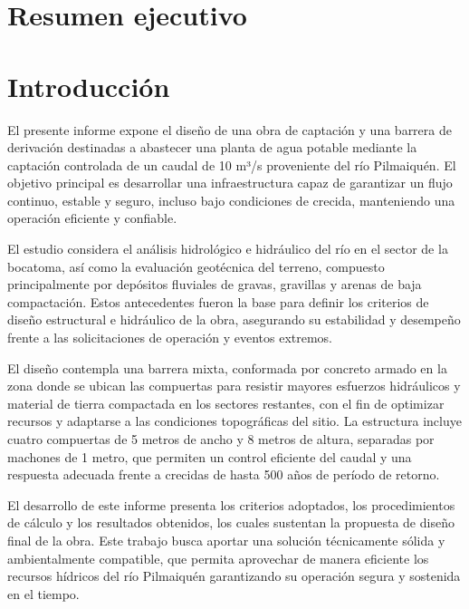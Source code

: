\documentclass{article} %
\begin{document}
\newpage
\section{Resumen ejecutivo}

\newpage
\tableofcontents %
\newpage
\section{Introducción}

El presente informe expone el diseño de una obra de captación y una barrera de derivación destinadas a abastecer una planta de agua potable mediante la captación controlada de un caudal de 10 m³/s proveniente del río Pilmaiquén. El objetivo principal es desarrollar una infraestructura capaz de garantizar un flujo continuo, estable y seguro, incluso bajo condiciones de crecida, manteniendo una operación eficiente y confiable.

El estudio considera el análisis hidrológico e hidráulico del río en el sector de la bocatoma, así como la evaluación geotécnica del terreno, compuesto principalmente por depósitos fluviales de gravas, gravillas y arenas de baja compactación. Estos antecedentes fueron la base para definir los criterios de diseño estructural e hidráulico de la obra, asegurando su estabilidad y desempeño frente a las solicitaciones de operación y eventos extremos.

El diseño contempla una barrera mixta, conformada por concreto armado en la zona donde se ubican las compuertas para resistir mayores esfuerzos hidráulicos y material de tierra compactada en los sectores restantes, con el fin de optimizar recursos y adaptarse a las condiciones topográficas del sitio. La estructura incluye cuatro compuertas de 5 metros de ancho y 8 metros de altura, separadas por machones de 1 metro, que permiten un control eficiente del caudal y una respuesta adecuada frente a crecidas de hasta 500 años de período de retorno.

El desarrollo de este informe presenta los criterios adoptados, los procedimientos de cálculo y los resultados obtenidos, los cuales sustentan la propuesta de diseño final de la obra. Este trabajo busca aportar una solución técnicamente sólida y ambientalmente compatible, que permita aprovechar de manera eficiente los recursos hídricos del río Pilmaiquén garantizando su operación segura y sostenida en el tiempo.
\end{document}
